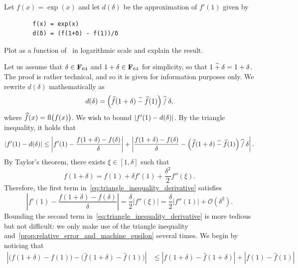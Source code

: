 \begin{compexercise}
    Let $f(x) = \exp(x)$ and let $d(\delta)$ be the approximation of $f'(1)$ given by
    \begin{verbatim}
        f(x) = exp(x)
        d(δ) = (f(1+δ) - f(1))/δ
    \end{verbatim}
    Plot  as a function of~ in logarithmic scale and explain the result.
\end{compexercise}
\begin{solution}
    Let us assume that $\delta \in \mathbf F_{64}$ and $1 + \delta \in \mathbf F_{64}$ for simplicity,
    so that $1 \mathbin{\widehat +} \delta = 1 + \delta$.
    The proof is rather technical, and so it is given for information purposes only.
    We rewrite $d(\delta)$ mathematically as
    \[
        d(\delta) = \Bigl(\widehat f(1 + \delta) \mathbin{\widehat -} \widehat f(1)\Bigr) \mathbin{\widehat /} \delta,
    \]
    where $\widehat f(x) = {\rm fl} \bigl(f(x)\bigr)$.
    We wish to bound $\lvert f'(1) - d(\delta)\rvert$.
    By the triangle inequality,
    it holds that
    \begin{equation}
        \label{eq:triangle_inequality_derivative}
        \lvert f'(1) - d(\delta)\rvert
        \leq \left\lvert f'(1) - \frac{f(1 + \delta) - f(\delta)}{\delta} \right\rvert 
        + \left\lvert \frac{f(1 + \delta) - f(\delta)}{\delta} - \Bigl(\widehat f(1 + \delta) \mathbin{\widehat -} \widehat f(1)\Bigr) \mathbin{\widehat /} \delta \right\rvert.
    \end{equation}
    By Taylor's theorem, there exists $\xi \in [1, \delta]$ such that
    \[
        f(1 + \delta) = f(1) + \delta f'(1) + \frac{\delta^2}{2} f''(\xi).
    \]
    Therefore, the first term in~\eqref{eq:triangle_inequality_derivative} satisfies
    \[
        \left\lvert f'(1) - \frac{f(1 + \delta) - f(\delta)}{\delta} \right\rvert 
        = \frac{\delta}{2} \lvert f''(\xi) \rvert
        = \frac{\delta}{2} \lvert f''(1) \rvert + \mathcal O(\delta^2).
    \]
    Bounding the second term in~\eqref{eq:triangle_inequality_derivative} is more tedious but not difficult:
    we only make use of the triangle inequality and~\cref{prop:relative_error_and_machine_epsilon} several times.
    We begin by noticing that
    \begin{align}
        \nonumber
        \left\lvert \bigl( f(1+ \delta) - f(1) \bigr)  
        - \bigl( \widehat f(1 + \delta) - \widehat f(1) \bigr) \right\rvert
        &\leq  
        \left\lvert f(1 + \delta) - \widehat f(1 + \delta) \right\rvert
        + \left\lvert f(1) - \widehat f(1) \right\rvert \\

\end{align}
\end{solution}

